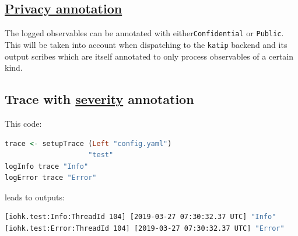 \begin{mdframed}
    \section*{\href{https://github.com/input-output-hk/iohk-monitoring-framework/blob/master/iohk-monitoring/src/Cardano/BM/Data/LogItem.lhs}{Privacy annotation}}

    The logged observables can be annotated with either\newline \texttt{Confidential} or \texttt{Public}. This will be taken into account when dispatching to the \texttt{katip} backend and its output scribes which are itself annotated to only process observables of a certain kind.
\end{mdframed}

\begin{mdframed}
    \section*{Trace with \href{https://github.com/input-output-hk/iohk-monitoring-framework/blob/master/iohk-monitoring/src/Cardano/BM/Data/Severity.lhs}{severity} annotation}

This code:

    \begin{lstlisting}[language=Haskell]
trace <- setupTrace (Left "config.yaml")
                    "test"
logInfo trace "Info"
logError trace "Error"
    \end{lstlisting}

leads to outputs:

    \begin{lstlisting}[language=Bash]
[iohk.test:Info:ThreadId 104] [2019-03-27 07:30:32.37 UTC] "Info"
[iohk.test:Error:ThreadId 104] [2019-03-27 07:30:32.37 UTC] "Error"
    \end{lstlisting}
\end{mdframed}

